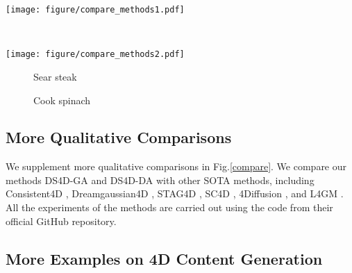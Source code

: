 \begin{figure*}[t]
    \centering
	\begin{minipage}{1\linewidth}
        \centerline{\texttt{[image: figure/compare\_methods1.pdf]}}
	\end{minipage}
	\\ \vspace{1mm}
	\begin{minipage}{1\linewidth}
        \centerline{\texttt{[image: figure/compare\_methods2.pdf]}}
	\end{minipage}
	\caption{Qualitative comparison on video-to-4D generation. For each method, we render results under two novel views at two timestamps.}
\label{compare}
\end{figure*}



\begin{figure*}
  \centering
  \begin{subfigure}{0.48\linewidth}
    \caption{Sear steak}
    \label{s1}
  \end{subfigure}
  \begin{subfigure}{0.48\linewidth}
    \caption{Cook spinach}
    \label{s2}
  \end{subfigure}
  \caption{Visualization of real-world 4D scene generation compared with 4D-GS.}
  \label{discussion}
\end{figure*}


\subsection{More Qualitative Comparisons}

We supplement more qualitative comparisons in Fig.\ref{compare}. We compare our methods DS4D-GA and DS4D-DA with other SOTA methods, including Consistent4D \cite{jiang2024consistentd}, Dreamgaussian4D \cite{ren2023dreamgaussian4d}, STAG4D \cite{zeng2024stag4d}, SC4D \cite{wu2024sc4d}, 4Diffusion \cite{zhang20244diffusion}, and L4GM \cite{ren2024l4gm}. All the experiments of the methods are carried out using the code from their official GitHub repository.



\subsection{More Examples on 4D Content Generation}

